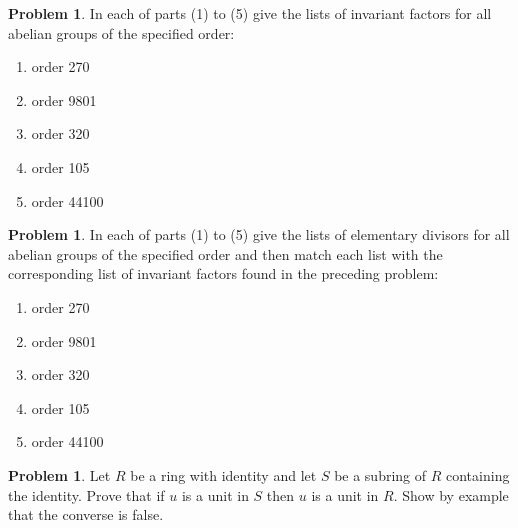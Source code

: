 \documentclass{amsart}
\numberwithin{equation}{section}
\theoremstyle{definition}
\newtheorem{problem}[thm]{Problem}
\begin{document}


\begin{problem}
  In each of parts (1) to (5) give the lists of invariant factors for all abelian groups of the specified order:
\begin{enumerate}
\item order 270
\item order 9801
\item order 320
\item order 105
\item order 44100
\end{enumerate}
\end{problem}



\begin{problem}
  In each of parts (1) to (5) give the lists of elementary divisors
  for all abelian groups of the specified order and then match each
  list with the corresponding list of invariant factors found
  in the preceding problem:
\begin{enumerate}
\item order 270
\item order 9801
\item order 320
\item order 105
\item order 44100
\end{enumerate}
\end{problem}




\begin{problem}
  Let \(R\) be a ring with identity and let \(S\) be a subring of
  \(R\) containing the identity. Prove that if \(u\) is a unit in
  \(S\) then \(u\) is a unit in \(R\). Show by example that the
  converse is false.
\end{problem}
\end{document}

